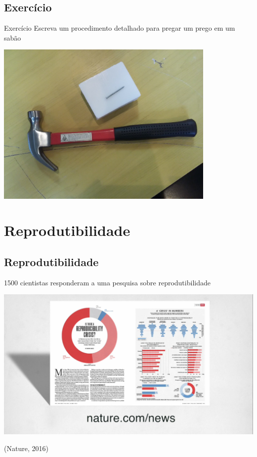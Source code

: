 \documentclass{beamer}
\begin{document}
\subsection{Exercício}

\begin{frame}{Exercício}
Escreva um procedimento detalhado para pregar um prego em um sabão

  \begin{center}
    \includegraphics[width=0.8\textwidth]{Intro/pregomartelo}
  \end{center}
\end{frame}

\section{Reprodutibilidade}
\subsection{Reprodutibilidade}


\begin{frame}
  1500 cientistas responderam a uma pesquisa sobre reprodutibilidade

\includegraphics[width=\textwidth]{Intro/reprod-nature3}

  \vfill
  \begin{center}
    (Nature, 2016)
  \end{center}
\end{frame}
\end{document}
